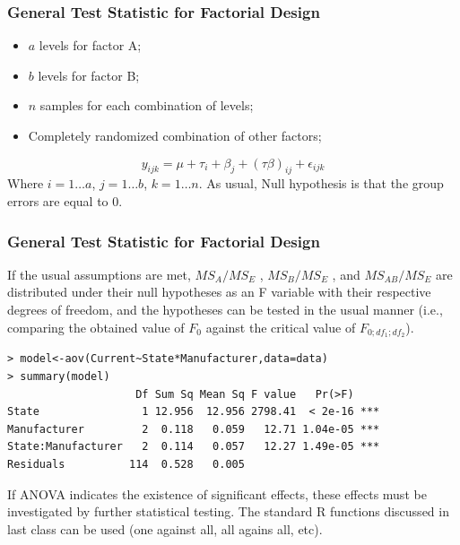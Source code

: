 \documentclass[10pt]{beamer}
\begin{document}
\begin{frame}
  \frametitle{General Test Statistic for Factorial Design}
  \begin{itemize}
    \item $a$ levels for factor A;
    \item $b$ levels for factor B;
    \item $n$ samples for each combination of levels;
    \item Completely randomized combination of other factors;
  \end{itemize}
  \begin{equation*}
    y_{ijk} = \mu + \tau_i + \beta_j + (\tau\beta)_{ij} + \epsilon_{ijk}
  \end{equation*}
  Where $i = 1\dots a$, $j = 1\dots b$, $k = 1\dots n$. As usual, Null
  hypothesis is that the group errors are equal to 0.
\end{frame}

\begin{frame}
  \frametitle{General Test Statistic for Factorial Design}
  {\small
    \begin{block}{}
      If the usual assumptions are met, $MS_A/MS_E$ , $MS_B/MS_E$ ,
      and $MS_{AB}/MS_E$ are distributed under their null hypotheses as
      an F variable with their respective degrees of freedom, and the
      hypotheses can be tested in the usual manner (i.e., comparing
      the obtained value of $F_0$ against the critical value of $F_{0;df_1;df_2}$).
    \end{block}
\begin{verbatim}
> model<-aov(Current~State*Manufacturer,data=data)
> summary(model)
                    Df Sum Sq Mean Sq F value   Pr(>F)    
State                1 12.956  12.956 2798.41  < 2e-16 ***
Manufacturer         2  0.118   0.059   12.71 1.04e-05 ***
State:Manufacturer   2  0.114   0.057   12.27 1.49e-05 ***
Residuals          114  0.528   0.005
\end{verbatim}
  } 

If ANOVA indicates the existence of significant effects, these effects
must be investigated by further statistical testing. The standard R
functions discussed in last class can be used (one against all, all
agains all, etc).

\end{frame} 

\end{document}
